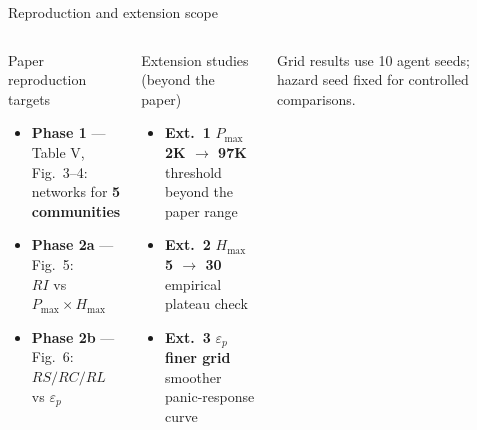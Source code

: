 \documentclass[aspectratio=169, xcolor=table]{beamer}
\begin{document}
\begin{frame}[t]{Reproduction and extension scope}
\footnotesize

\begin{center}
\end{center}

\vspace{0.35em}
\begin{columns}[T,onlytextwidth]
\begin{block}{\small Paper reproduction targets}
\scriptsize
\begin{itemize}\itemsep0.25em
  \item \textbf{Phase 1} --- Table V, Fig.\ 3--4:\\
        networks for \textbf{5 communities}
  \item \textbf{Phase 2a} --- Fig.\ 5:\\
        $RI$ vs $P_{\max} \times H_{\max}$
  \item \textbf{Phase 2b} --- Fig.\ 6:\\
        $RS / RC / RL$ vs $\varepsilon_p$
\end{itemize}
\end{block}

\begin{alertblock}{\small Extension studies (beyond the paper)}
\scriptsize
\begin{itemize}\itemsep0.25em
  \item \textbf{Ext.\ 1} $P_{\max}$ \textbf{2K $\to$ 97K}\\
        threshold beyond the paper range
  \item \textbf{Ext.\ 2} $H_{\max}$ \textbf{5 $\to$ 30}\\
        empirical plateau check
  \item \textbf{Ext.\ 3} $\varepsilon_p$ \textbf{finer grid}\\
        smoother panic-response curve
\end{itemize}
\end{alertblock}
\vspace{0.25em}
{\scriptsize Grid results use 10 agent seeds; hazard seed fixed for controlled comparisons.}
\end{columns}


\end{frame}
\end{document}
